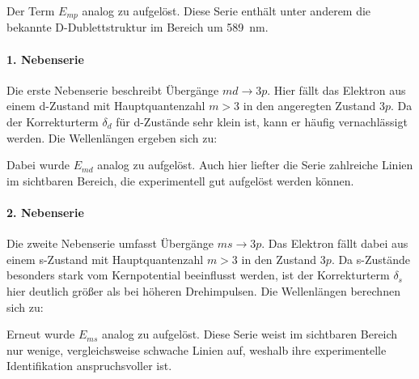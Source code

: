 
Der Term $E_{mp}$ analog zu  aufgelöst. Diese Serie enthält unter anderem die bekannte D-Dublettstruktur im Bereich um \SI{589}{\nano\meter}.

\paragraph{1. Nebenserie}
Die erste Nebenserie beschreibt Übergänge $m d \rightarrow 3p$. Hier fällt das Elektron aus einem d-Zustand mit Hauptquantenzahl $m > 3$ in den angeregten Zustand $3p$. Da der Korrekturterm $\delta_d$ für d-Zustände sehr klein ist, kann er häufig vernachlässigt werden. Die Wellenlängen ergeben sich zu:


Dabei wurde $E_{md}$ analog zu  aufgelöst. Auch hier liefter die Serie zahlreiche Linien im sichtbaren Bereich, die experimentell gut aufgelöst werden können.

\paragraph{2. Nebenserie}
Die zweite Nebenserie umfasst Übergänge $m s \rightarrow 3p$. Das Elektron fällt dabei aus einem s-Zustand mit Hauptquantenzahl $m > 3$ in den Zustand $3p$. Da s-Zustände besonders stark vom Kernpotential beeinflusst werden, ist der Korrekturterm $\delta_s$ hier deutlich größer als bei höheren Drehimpulsen. Die Wellenlängen berechnen sich zu:


Erneut wurde $E_{ms}$ analog zu  aufgelöst. Diese Serie weist im sichtbaren Bereich nur wenige, vergleichsweise schwache Linien auf, weshalb ihre experimentelle Identifikation anspruchsvoller ist.
